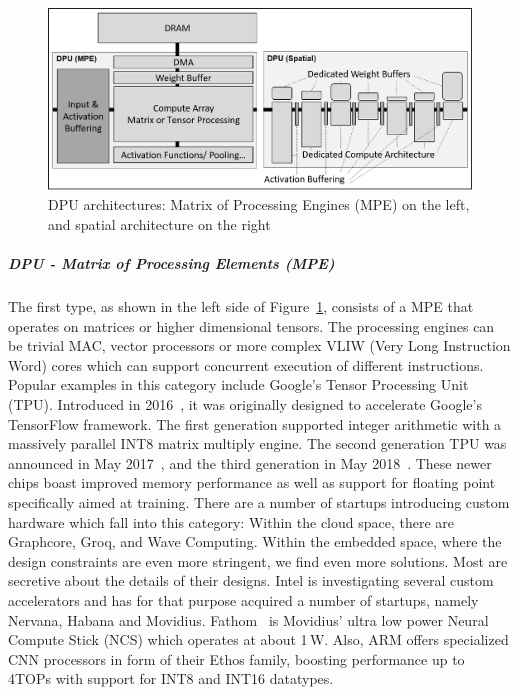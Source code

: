 \begin{figure}[h!]
\centering
\includegraphics[width=0.8\linewidth]{figures/dpu1.png}
\caption{DPU architectures: Matrix of Processing Engines (MPE) on the left, and spatial architecture on the right}
\label{fig:dpu}
\end{figure}

\subparagraph{DPU - Matrix of Processing Elements (MPE)} The first type, as shown in the left side of Figure~\ref{fig:dpu}, consists of a MPE that operates on matrices or higher dimensional tensors. The processing engines can be trivial MAC, vector processors or more complex VLIW (Very Long Instruction Word) cores which can support concurrent execution of different instructions.
Popular examples in this category include Google's Tensor Processing Unit (TPU).  
Introduced in 2016~\cite{tpu1}, it was originally designed to accelerate Google's TensorFlow framework.
The first generation supported integer arithmetic with a massively parallel INT8 matrix multiply engine.
The second generation TPU was announced in May 2017~\cite{tpu}, and the third generation in May 2018~\cite{tpu3}.
These newer chips boast improved memory performance as well as support for floating point specifically aimed at training.  
There are a number of startups introducing custom hardware which fall into this category:
Within the cloud space, there are Graphcore, Groq, and Wave Computing.
Within the embedded space, where the design constraints are even more stringent, we find even more solutions. %
Most are secretive about the details of their designs. Intel is investigating several custom accelerators and has for that purpose acquired a number of startups, namely Nervana, Habana and Movidius. Fathom~\cite{movidius-tom} is Movidius' ultra low power Neural Compute Stick (NCS) which operates at about 1\,W.  
Also, ARM offers specialized CNN processors in form of their Ethos family, boosting performance up to 4TOPs with support for INT8 and INT16 datatypes.

